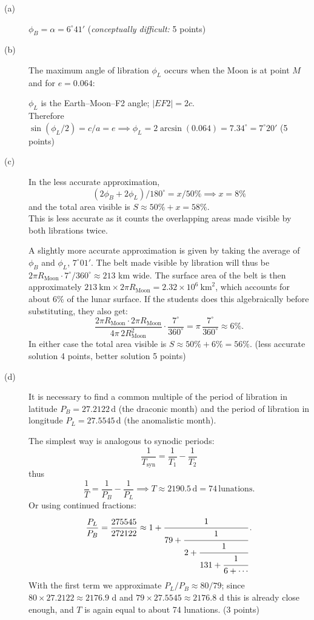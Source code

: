 \begin{description}
\item[(a)] $\phi_B = \alpha = 6^\circ 41'$
  \hfill(\textit{conceptually difficult:} 5 points)


\item[(b)] The maximum angle of libration $\phi_L$ occurs when the Moon is at
  point $M$ and for $e = 0.064$:


  $\phi_L$ is the Earth--Moon--F2 angle; $|EF2| = 2c$.\\
  Therefore
  $\sin(\phi_L/2) = c/a = e \implies
   \phi_L = 2\arcsin(0.064) = 7.34^\circ = 7^\circ 20'$
  \hfill(5 points)

\item[(c)] In the less accurate approximation,
  \[
    (2\phi_B + 2\phi_L)/180^\circ = x/50\% \implies x = 8\%
  \]
  and the total area visible is $S \approx 50\% + x = 58\%$.\\
  This is less accurate as it counts the overlapping areas made visible by both
  librations twice.

  A slightly more accurate approximation is given by taking the average of
  $\phi_B$ and $\phi_L$, $7^\circ 01'$. The belt made visible by libration will
  thus be $2\pi R_{\mathrm{Moon}} \cdot 7^\circ/360^\circ \approx 213$ km wide.
  The surface area of the belt is then approximately
  $213\ \mathrm{km} \times 2\pi R_{\mathrm{Moon}}
   = 2.32 \times 10^{6}\ \mathrm{km}^2$, which accounts for about 6\% of the
  lunar surface. If the students does this algebraically before substituting,
  they also get: %
  \[
    \frac{2\pi R_{\mathrm{Moon}} \cdot 2\pi R_{\mathrm{Moon}}}
         {4\pi \, 2 R_{\mathrm{Moon}}^2}
    \cdot \frac{7^\circ}{360^\circ}
    = \pi \, \frac{7^\circ}{360^\circ} \approx 6\%.
  \]
  In either case the total area visible is $S \approx 50\% + 6\% = 56\%$.
  \hfill(less accurate solution 4 points, better solution 5 points)

\item[(d)] It is necessary to find a common multiple of the period of libration
  in latitude $P_B = 27.2122$\,d (the draconic month) and the period of
  libration in longitude $P_L = 27.5545$\,d (the anomalistic month).

  The simplest way is analogous to synodic periods:
  \[
    \frac{1}{T_{\mathrm{syn}}} = \frac{1}{T_1} - \frac{1}{T_2}
  \]
  thus
  \[
    \frac{1}{T} = \frac{1}{P_B} - \frac{1}{P_L}
    \implies T \approx 2190.5\,\mathrm{d} = 74\,\mathrm{lunations}.
  \]
  Or using continued fractions:
  \[
    \frac{P_L}{P_B} = \frac{275545}{272122}
    \approx 1 + \cfrac{1}{79 + \cfrac{1}{2 + \cfrac{1}{131 + \cfrac{1}{6 + \cdots}}}}\,.
  \]
  With the first term we approximate $P_L/P_B \approx 80/79$; since
  $80 \times 27.2122 \approx 2176.9$ d and $79 \times 27.5545 \approx 2176.8$ d
  this is already close enough, and $T$ is again equal to about 74 lunations.
  \hfill(3 points)


\end{description}
